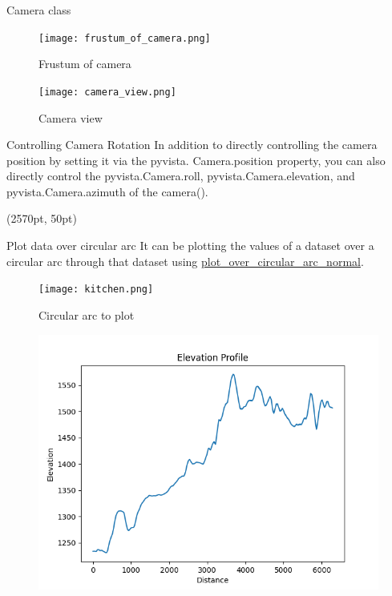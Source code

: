 \documentclass[final]{beamer}
\begin{document}
\begin{frame}[fragile]
\begin{textblock*}{800pt}
\begin{block}{Camera class}

\begin{figure}
\texttt{[image: frustum\_of\_camera.png]}
\caption{Frustum of camera \label{CameraFrustumFigure}}
\end{figure}

\begin{figure}
\texttt{[image: camera\_view.png]}
\caption{Camera view}
\end{figure}
\end{block}
\begin{block}{Controlling Camera Rotation}
In addition to directly controlling the camera position by setting it via the pyvista.
Camera.position property, you can also directly control the pyvista.Camera.roll, pyvista.Camera.elevation, and pyvista.Camera.azimuth of the camera().
\end{block}
\end{textblock*}
\begin{textblock*}{800pt}(2570pt, 50pt)
\begin{block}{Plot data over circular arc}
It can be plotting the values of a dataset over a circular arc through that dataset using
\href{https://dev.pyvista.org/core/filters.html#pyvista.DataSetFilters.plot_over_circular_arc_normal}{plot\_over\_circular\_arc\_normal}.

\begin{figure}
\texttt{[image: kitchen.png]}
\caption{Circular arc to plot \label{CircularArcToPlot}}
\end{figure}
\end{block}

\begin{figure}
\includegraphics[width=0.9\linewidth]{elevation.png}

\end{figure}
\end{textblock*}
\end{frame}
\end{document}
